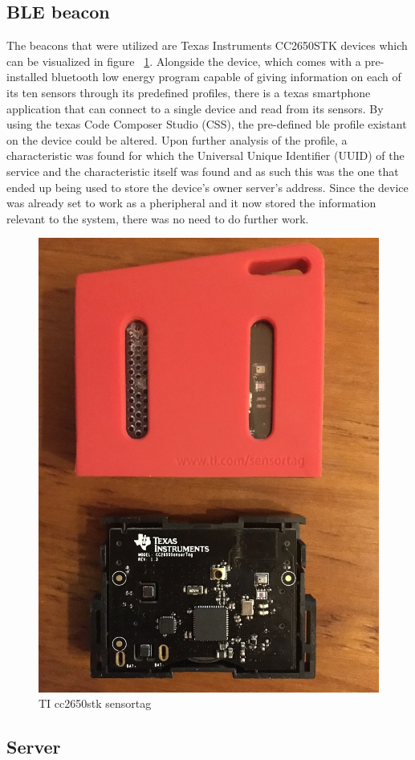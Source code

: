 \documentclass[a4paper]{IEEEtran}
\begin{document}
\subsection{ BLE beacon}
\label{subsec:beacon}

The beacons that were utilized are Texas Instruments CC2650STK devices which can be visualized in figure ~\ref{fig:beacon}. Alongside the device, which comes with a pre-installed bluetooth low energy program capable of giving information on each of its ten sensors through its predefined profiles, there is a texas smartphone application that can connect to a single device and read from its sensors. By using the texas Code Composer Studio (CSS), the pre-defined ble profile existant on the device could be altered. Upon further analysis of the profile, a characteristic was found for which the Universal Unique Identifier (UUID) of the service and the characteristic itself was found and as such this was the one that ended up being used to store the device's owner server's address. Since the device was already set to work as a pheripheral and it now stored the information relevant to the system, there was no need to do further work.

\begin{figure}
	\centering
		\includegraphics[width=0.5\linewidth]{figures/beacon.jpg}
	\caption[TI cc2650stk sensortag]{TI cc2650stk sensortag}
	\label{fig:beacon}
\end{figure}


\subsection{ Server}
\label{subsec:server}
\end{document}
